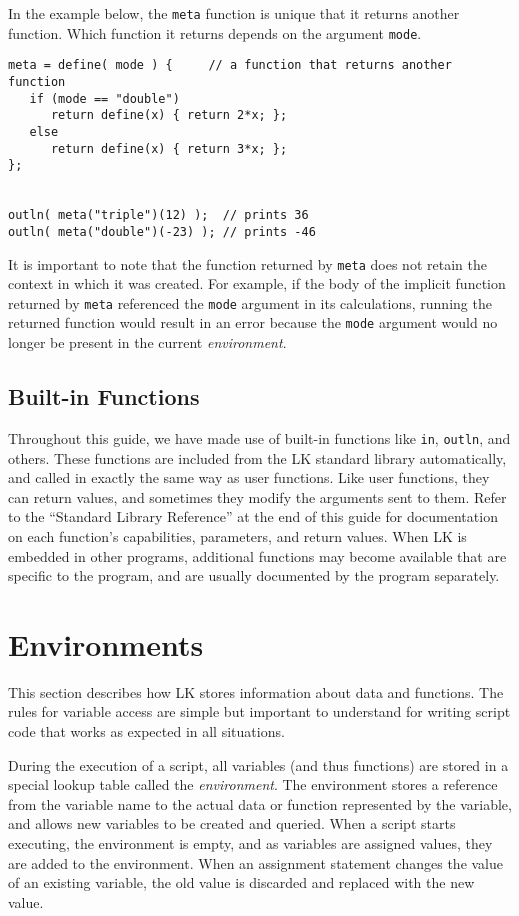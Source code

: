 \documentclass{article}
\begin{document}
In the example below, the \texttt{meta} function is unique that it returns another function.  Which function it returns depends on the argument \texttt{mode}.

\begin{verbatim}
meta = define( mode ) {     // a function that returns another function
   if (mode == "double")
      return define(x) { return 2*x; };
   else
      return define(x) { return 3*x; };
};


outln( meta("triple")(12) );  // prints 36
outln( meta("double")(-23) ); // prints -46

\end{verbatim}

It is important to note that the function returned by \texttt{meta} does not retain the context in which it was created.  For example, if the body of the implicit function returned by \texttt{meta} referenced the \texttt{mode} argument in its calculations, running the returned function would result in an error because the \texttt{mode} argument would no longer be present in the current \emph{environment}.

\subsection{Built-in Functions}

Throughout this guide, we have made use of built-in functions like \texttt{in}, \texttt{outln}, and others.  These functions are included from the LK standard library automatically, and called in exactly the same way as user functions.  Like user functions, they can return values, and sometimes they modify the arguments sent to them.  Refer to the ``Standard Library Reference'' at the end of this guide for documentation on each function's capabilities, parameters, and return values.  When LK is embedded in other programs, additional functions may become available that are specific to the program, and are usually documented by the program separately.


\section{Environments}

This section describes how LK stores information about data and functions.  The rules for variable access are simple but important to understand for writing script code that works as expected in all situations.

During the execution of a script, all variables (and thus functions) are stored in a special lookup table called the \emph{environment}.  The environment stores a reference from the variable name to the actual data or function represented by the variable, and allows new variables to be created and queried.  When a script starts executing, the environment is empty, and as variables are assigned values, they are added to the environment.  When an assignment statement changes the value of an existing variable, the old value is discarded and replaced with the new value.
\end{document}
